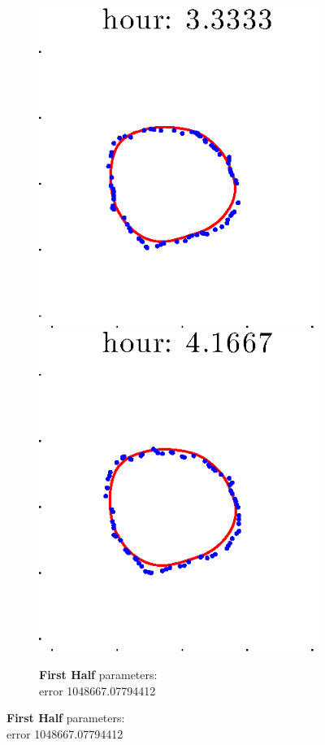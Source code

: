 \documentclass[12pt]{article}
\begin{document}
\begin{figure}[h!]
\begin{subfigure}[b]{.3\textwidth}
		\includegraphics[height=.15\textheight]{Pos5exp2/firsthalf/first5.eps}
		\includegraphics[height=.15\textheight]{Pos5exp2/firsthalf/first6.eps}
		\caption{\textbf{First Half} parameters: \\error 1048667.07794412}

\end{subfigure}
\end{figure}
\end{document}
